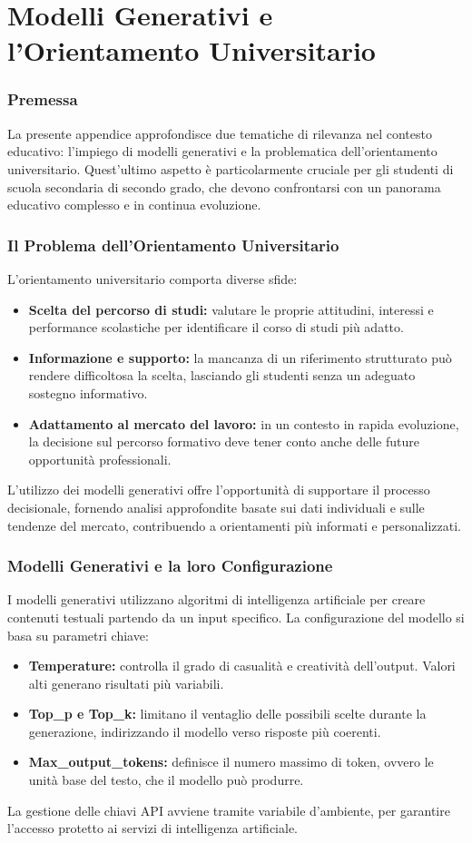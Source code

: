 \chapter{Modelli Generativi e l'Orientamento Universitario}
\subsection*{Premessa}
La presente appendice approfondisce due tematiche di rilevanza nel contesto educativo: l'impiego di modelli generativi e la problematica dell'orientamento universitario. Quest'ultimo aspetto è particolarmente cruciale per gli studenti di scuola secondaria di secondo grado, che devono confrontarsi con un panorama educativo complesso e in continua evoluzione.

\subsection*{Il Problema dell'Orientamento Universitario}
L'orientamento universitario comporta diverse sfide:
\begin{itemize}
    \item \textbf{Scelta del percorso di studi:} valutare le proprie attitudini, interessi e performance scolastiche per identificare il corso di studi più adatto.
    \item \textbf{Informazione e supporto:} la mancanza di un riferimento strutturato può rendere difficoltosa la scelta, lasciando gli studenti senza un adeguato sostegno informativo.
    \item \textbf{Adattamento al mercato del lavoro:} in un contesto in rapida evoluzione, la decisione sul percorso formativo deve tener conto anche delle future opportunità professionali.
\end{itemize}
L’utilizzo dei modelli generativi offre l’opportunità di supportare il processo decisionale, fornendo analisi approfondite basate sui dati individuali e sulle tendenze del mercato, contribuendo a orientamenti più informati e personalizzati.

\subsection*{Modelli Generativi e la loro Configurazione}
I modelli generativi utilizzano algoritmi di intelligenza artificiale per creare contenuti testuali partendo da un input specifico. La configurazione del modello si basa su parametri chiave:
\begin{itemize}
    \item \textbf{Temperature:} controlla il grado di casualità e creatività dell'output. Valori alti generano risultati più variabili.
    \item \textbf{Top\_p e Top\_k:} limitano il ventaglio delle possibili scelte durante la generazione, indirizzando il modello verso risposte più coerenti.
    \item \textbf{Max\_output\_tokens:} definisce il numero massimo di token, ovvero le unità base del testo, che il modello può produrre.
\end{itemize}
La gestione delle chiavi API avviene tramite variabile d'ambiente, per garantire l’accesso protetto ai servizi di intelligenza artificiale.

